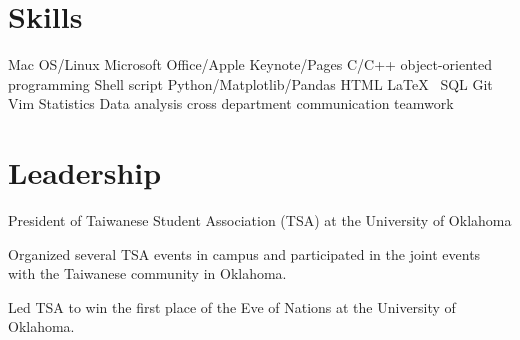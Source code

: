 \documentclass[letterpaper]{deedy-resume-openfont}
\begin{document}
\section{Skills}
Mac OS/Linux \textbullet{} Microsoft Office/Apple Keynote/Pages \textbullet{} C/C++ \textbullet{} object-oriented programming \textbullet{} Shell script \textbullet{} Python/Matplotlib/Pandas \textbullet{} HTML \textbullet{} \LaTeX\ \textbullet{} SQL \textbullet{} Git \textbullet{} Vim \textbullet{} Statistics \textbullet{} Data analysis \textbullet{} cross department communication \textbullet{} teamwork\\
\sectionsep



\section{Leadership}
President of Taiwanese Student Association (TSA) at the University of Oklahoma\\
\begin{tightemize}
\item Organized several TSA events in campus and participated in the joint events with the Taiwanese community in Oklahoma.
\item Led TSA to win the first place of the Eve of Nations at the University of Oklahoma.
\end{tightemize}
\sectionsep
\end{document}
